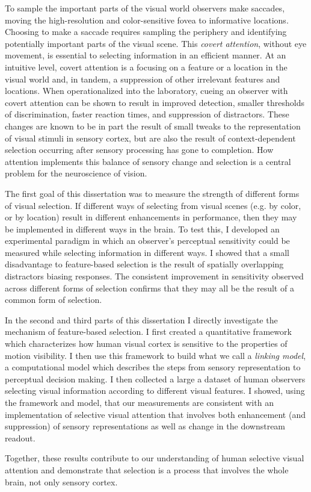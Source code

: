 To sample the important parts of the visual world observers make saccades, moving the high-resolution and color-sensitive fovea to informative locations. Choosing to make a saccade requires sampling the periphery and identifying potentially important parts of the visual scene. This \emph{covert attention}, without eye movement, is essential to selecting information in an efficient manner. At an intuitive level, covert attention is a focusing on a feature or a location in the visual world and, in tandem, a suppression of other irrelevant features and locations. When operationalized into the laboratory, cueing an observer with covert attention can be shown to result in improved detection, smaller thresholds of discrimination, faster reaction times, and suppression of distractors. These changes are known to be in part the result of small tweaks to the representation of visual stimuli in sensory cortex, but are also the result of context-dependent selection occurring after sensory processing has gone to completion. How attention implements this balance of sensory change and selection is a central problem for the neuroscience of vision.

The first goal of this dissertation was to measure the strength of different forms of visual selection. If different ways of selecting from visual scenes (e.g. by color, or by location) result in different enhancements in performance, then they may be implemented in different ways in the brain. To test this, I developed an experimental paradigm in which an observer's perceptual sensitivity could be measured while selecting information in different ways. I showed that a small disadvantage to feature-based selection is the result of spatially overlapping distractors biasing responses. The consistent improvement in sensitivity observed across different forms of selection confirms that they may all be the result of a common form of selection. 

In the second and third parts of this dissertation I directly investigate the mechanism of feature-based selection. I first created a quantitative framework which characterizes how human visual cortex is sensitive to the properties of motion visibility. I then use this framework to build what we call a \emph{linking model}, a computational model which describes the steps from sensory representation to perceptual decision making. I then collected a large a dataset of human observers selecting visual information according to different visual features. I showed, using the framework and model, that our measurements are consistent with an implementation of selective visual attention that involves both enhancement (and suppression) of sensory representations as well as change in the downstream readout. 

Together, these results contribute to our understanding of human selective visual attention and demonstrate that selection is a process that involves the whole brain, not only sensory cortex.